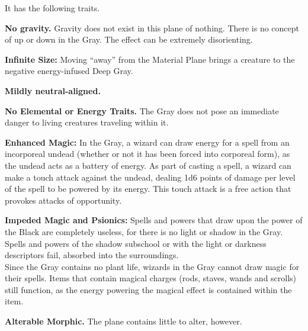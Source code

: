 It has the following traits.
\begin{itemize*}
\item \textbf{No gravity.} Gravity does not exist in this plane of nothing. There is no concept of up or down in the Gray. The effect can be extremely disorienting.
\item \textbf{Infinite Size:} Moving ``away'' from the Material Plane brings a creature to the negative energy-infused Deep Gray.
\item \textbf{Mildly neutral-aligned.}
\item \textbf{No Elemental or Energy Traits.} The Gray does not pose an immediate danger to living creatures traveling within it.
\item \textbf{Enhanced Magic:} In the Gray, a wizard can draw energy for a spell from an incorporeal undead (whether or not it has been forced into corporeal form), as the undead acts as a battery of energy. As part of casting a spell, a wizard can make a touch attack against the undead, dealing 1d6 points of damage per level of the spell to be powered by its energy. This touch attack is a free action that provokes attacks of opportunity.
\item \textbf{Impeded Magic and Psionics:} Spells and powers that draw upon the power of the Black are completely useless, for there is no light or shadow in the Gray. Spells and powers of the shadow subschool or with the light or darkness descriptors fail, absorbed into the surroundings.\\

Since the Gray contains no plant life, wizards in the Gray cannot draw magic for their spells. Items that contain magical charges (rods, staves, wands and scrolls) still function, as the energy powering the magical effect is contained within the item.
\item \textbf{Alterable Morphic.} The plane contains little to alter, however.
\end{itemize*}



